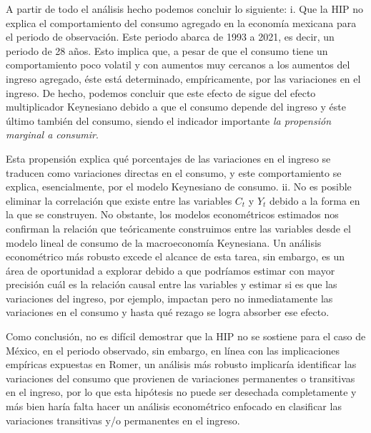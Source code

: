 \documentclass[
]{article}
\begin{document}
A partir de todo el análisis hecho podemos concluir lo siguiente: i. Que
la HIP no explica el comportamiento del consumo agregado en la economía
mexicana para el periodo de observación. Este periodo abarca de 1993 a
2021, es decir, un periodo de 28 años. Esto implica que, a pesar de que
el consumo tiene un comportamiento poco volatil y con aumentos muy
cercanos a los aumentos del ingreso agregado, éste está determinado,
empíricamente, por las variaciones en el ingreso. De hecho, podemos
concluir que este efecto de sigue del efecto multiplicador Keynesiano
debido a que el consumo depende del ingreso y éste último también del
consumo, siendo el indicador importante \emph{la propensión marginal a
consumir}.

Esta propensión explica qué porcentajes de las variaciones en el ingreso
se traducen como variaciones directas en el consumo, y este
comportamiento se explica, esencialmente, por el modelo Keynesiano de
consumo. ii. No es posible eliminar la correlación que existe entre las
variables \(C_t\) y \(Y_t\) debido a la forma en la que se construyen.
No obstante, los modelos econométricos estimados nos confirman la
relación que teóricamente construimos entre las variables desde el
modelo lineal de consumo de la macroeconomía Keynesiana. Un análisis
econométrico más robusto excede el alcance de esta tarea, sin embargo,
es un área de oportunidad a explorar debido a que podríamos estimar con
mayor precisión cuál es la relación causal entre las variables y estimar
si es que las variaciones del ingreso, por ejemplo, impactan pero no
inmediatamente las variaciones en el consumo y hasta qué rezago se logra
absorber ese efecto.

Como conclusión, no es difícil demostrar que la HIP no se sostiene para
el caso de México, en el periodo observado, sin embargo, en línea con
las implicaciones empíricas expuestas en Romer, un análisis más robusto
implicaría identificar las variaciones del consumo que provienen de
variaciones permanentes o transitivas en el ingreso, por lo que esta
hipótesis no puede ser desechada completamente y más bien haría falta
hacer un análisis econométrico enfocado en clasificar las variaciones
transitivas y/o permanentes en el ingreso.
\end{document}

